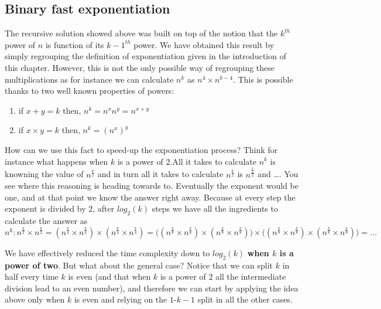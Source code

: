 \subsection{Binary fast exponentiation}
\label{exponentiation:sec:fast_exponentiation}
The recursive solution showed above was built on top of the notion that the ${k^{th}}$ power of $n$ is function of its ${k-1^{th}}$ power. We have obtained this result by simply regrouping the definition of exponentiation given in the introduction of this chapter. However, this is not the only possible way of regrouping these multiplications as for instance we can calculate $n^k$ as $n^{4} \times n^{k-4}$.
This is possible thanks to two well known properties of powers:
\begin{enumerate}
    \item if $x+y=k$ then, $n^k = n^x  n^y = n^{x+y}$ 
    \item if $x \times y=k$ then, $n^k = (n^x)^y$
\end{enumerate}

How can we use this fact to speed-up the exponentiation process? Think for instance what happens when  $k$ is a power of $2$.All it takes to calculate $n^k$ is knowning the value of $n^{\frac{k}{2}}$ and in turn all it takes to calculate $n^{\frac{k}{2}}$ is $n^{\frac{\frac{k}{2}}{2}}$ and \ldots. You see where this reasoning is heading towards to.
Eventually the exponent would be one, and at that point we know the answer right away. Because at every step the exponent is divided by $2$, after $log_2(k)$ steps we have all the ingredients to calculate the answer as $n^k : n^{\frac{k}{2}} \times n^{\frac{k}{2}} = (n^{\frac{k}{4}} \times n^{\frac{k}{4}}) \times (n^{\frac{k}{4}} \times n^{\frac{k}{4}}) = \big ( (n^{\frac{k}{8}} \times n^{\frac{k}{8}}) \times (n^{\frac{k}{8}} \times n^{\frac{k}{8}}) \big ) \times \big ( (n^{\frac{k}{8}} \times n^{\frac{k}{8}}) \times (n^{\frac{k}{8}} \times n^{\frac{k}{8}}) \big )  = \ldots $

We have effectively reduced the time complexity down to $log_2(k)$ \textbf{when $k$ is a power of two}. But what about the general case? Notice that we can split $k$ in half every time $k$ is even (and that when $k$ is a power of $2$ all the intermediate division lead to an even number), and therefore we can start by applying the idea above only when $k$ is even and relying on the $1$-$k-1$ split in all the other cases. 

